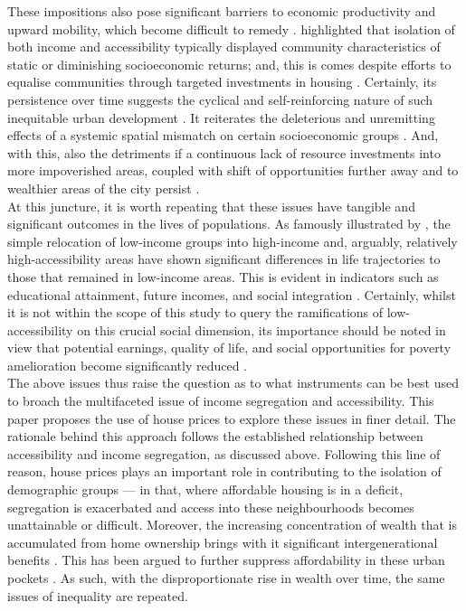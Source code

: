 These impositions also pose significant barriers to economic productivity and upward mobility, which become difficult to remedy \citep{cutler1997ghettos}. \cite{li2013residential} highlighted that isolation of both income and accessibility typically displayed community characteristics of static or diminishing socioeconomic returns; and, this is comes despite efforts to equalise communities through targeted investments in housing \citep{turner2009public}. Certainly, its persistence over time suggests the cyclical and self-reinforcing nature of such inequitable urban development \citep{massey1989hypersegregation}. It reiterates the deleterious and unremitting effects of a systemic spatial mismatch on certain socioeconomic groups \citep{kain1992spatial}. And, with this, also the detriments if a continuous lack of resource investments into more impoverished areas, coupled with shift of opportunities further away and to wealthier areas of the city persist  \citep{fan2012planners,kneebone2015growing}.\\

At this juncture, it is worth repeating that these issues have tangible and significant outcomes in the lives of populations. As famously illustrated by \cite{rosenbaum1995changing}, the simple relocation of low-income groups into high-income and, arguably, relatively high-accessibility areas have shown significant differences in life trajectories to those that remained in low-income areas. This is evident in indicators such as educational attainment, future incomes, and social integration \citep{rosenbaum1995changing}. Certainly, whilst it is not within the scope of this study to query the ramifications of low-accessibility on this crucial social dimension, its importance should be noted in view that potential earnings, quality of life, and social opportunities for poverty amelioration become significantly reduced \citep{jacobs1961death,beggs1997social, tigges1998social,alesina1999public,becker2009human}.\\

The above issues thus raise the question as to what instruments can be best used to broach the multifaceted issue of income segregation and accessibility. This paper proposes the use of house prices to explore these issues in finer detail. The rationale behind this approach follows the established relationship between accessibility and income segregation, as  discussed above. Following this line of reason, house prices plays an important role in contributing to the isolation of demographic groups \citep{maattanen2014income} --- in that, where affordable housing is in a deficit, segregation is exacerbated and access into these neighbourhoods becomes unattainable or difficult. Moreover, the increasing concentration of wealth that is accumulated from home ownership brings with it significant intergenerational benefits \citep{ohnishi2011evolution}. This has been argued to further suppress affordability in these urban pockets \citep{de2013explaining}. As such, with the disproportionate rise in wealth over time, the same issues of inequality are repeated. \\


